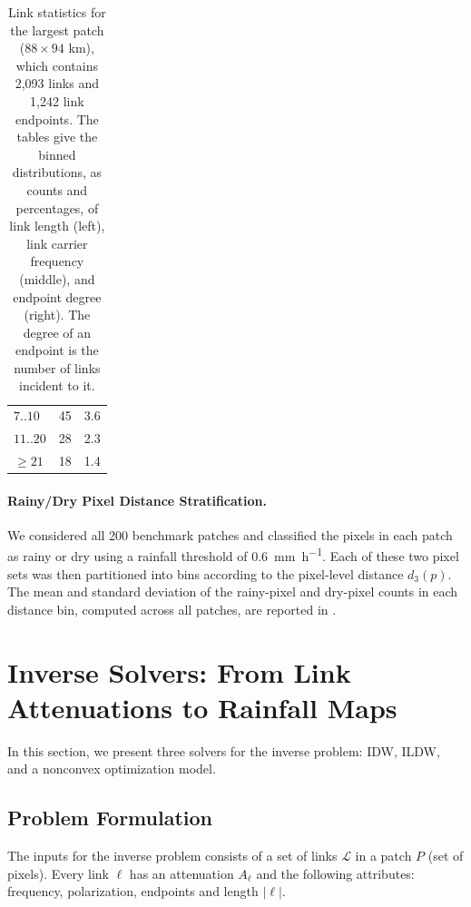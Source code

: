 \documentclass[a4paper,fleqn]{cas-sc}
\newcommand{\notebox}[3]{%
  \begingroup
  \setlength{\fboxsep}{2pt}%
  \fcolorbox{#1}{#2}{\textsf{\footnotesize #3}}%
  \endgroup
}
\DeclareRobustCommand{\editnote}[1]{%
  \texorpdfstring{%
    \nobreak\hfill
    \mbox{\notebox{red!50!black}{red!10}{#1}}%
  }{}%
}
\begin{document}
\begin{table}[!htbp]
\begin{minipage}[t]{0.31\textwidth}
\begin{tabular}{lrr}
      $7..10$             & 45    & 3.6  \\
      $11..20$            & 28    & 2.3  \\
      $\geq 21$          & 18    & 1.4  \\
      \bottomrule
    \end{tabular}
  \end{minipage}
  \caption{Link statistics for the largest patch ($88\times 94$ \si{\kilo\meter}), which contains 2,093 links and 1,242 link endpoints. The tables give the binned distributions, as counts and percentages, of link length (left), link carrier frequency (middle), and endpoint degree (right). The degree of an endpoint is the number of links incident to it.}

  \label{tab:largest_patch_distributions}
\end{table}



\paragraph{Rainy/Dry Pixel Distance Stratification.}
We considered all 200 benchmark patches and classified the pixels in each patch as rainy or dry using a rainfall threshold of \SI[round-mode=none]{0.6}{\milli\meter\per\hour}.
Each of these two pixel sets was then partitioned into bins according to the pixel-level distance $d_3(p)$.
The mean and standard deviation of the rainy-pixel and dry-pixel counts in each distance bin, computed across all patches, are reported in .



\section{Inverse Solvers: From Link Attenuations to Rainfall Maps\editnote{GE:stable}}
In this section, we present three solvers for the inverse problem: IDW, ILDW, and a nonconvex optimization model.

\subsection{Problem Formulation}
The inputs for the inverse problem consists of a set of links $\mathcal{L}$ in a patch $P$ (set of pixels). Every link $\ell$ has an attenuation $A_{\ell}$ and the following attributes: frequency, polarization, endpoints and length $|\ell|$.
\end{document}
